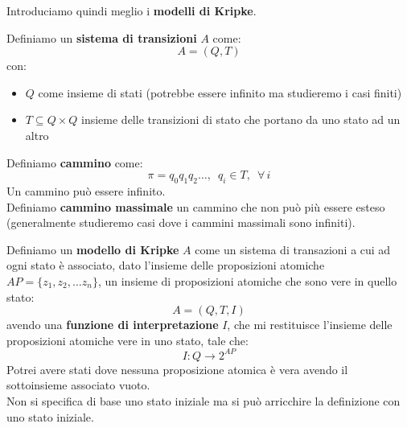Introduciamo quindi meglio i \textbf{modelli di Kripke}.\\
\begin{definizione}
  Definiamo un \textbf{sistema di transizioni} $A$ come:
  \[A=(Q, T)\]
  con:
  \begin{itemize}
    \item $Q$ come insieme di stati (potrebbe essere infinito ma studieremo i
    casi finiti)
    \item $T\subseteq Q\times Q$ insieme delle transizioni di stato che portano
    da uno stato ad un altro
  \end{itemize}
\end{definizione}
\begin{definizione}
  Definiamo \textbf{cammino} come:
  \[\pi=q_0q_1q_2\ldots,\,\,\, q_i\in T,\,\,\, \forall\, i\]
  Un cammino può essere infinito.\\
  Definiamo \textbf{cammino massimale} un cammino che non può più essere esteso
  (generalmente studieremo casi dove i cammini massimali sono infiniti).
\end{definizione}
\begin{definizione}
  Definiamo un \textbf{modello di Kripke} $A$ come un sistema di transazioni a
  cui ad ogni stato è associato, dato l'insieme delle proposizioni atomiche
  $AP=\{z_1, z_2,\ldots z_n\}$, un insieme  di
  proposizioni atomiche che sono vere in quello stato:
  \[A=(Q, T, I)\]
  avendo una \textbf{funzione di interpretazione} $I$, che mi restituisce
  l'insieme delle proposizioni atomiche vere in uno stato, tale che:
  \[I:Q\to 2^{AP}\]
  Potrei avere stati dove nessuna proposizione atomica è vera avendo il
  sottoinsieme associato vuoto.\\
  Non si specifica di base uno stato iniziale ma si può arricchire la
  definizione con uno stato iniziale.
\end{definizione}
